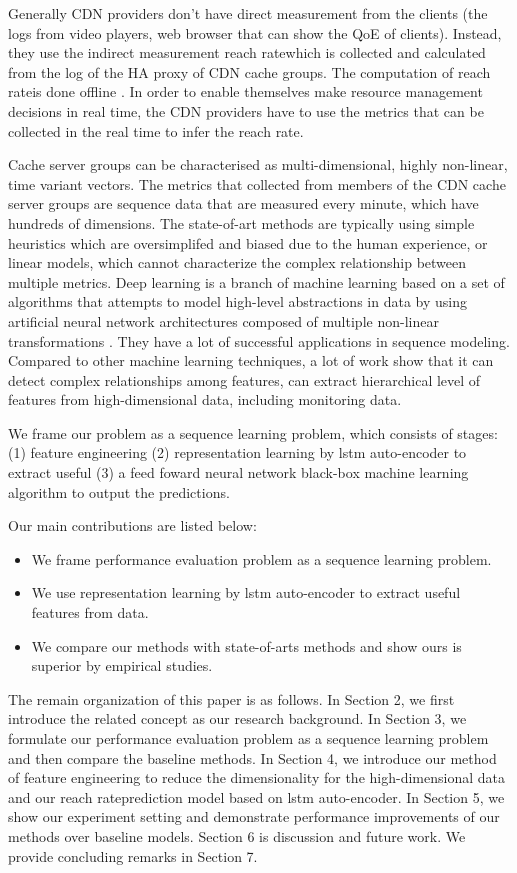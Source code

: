 \documentclass[5p]{elsarticle}
\newcommand{\dabiaolv}{reach rate}
\begin{document}
Generally CDN providers don't have direct measurement from the clients (the logs from video players, web browser that can show the QoE of clients). Instead, they use the indirect measurement \dabiaolv which is collected and calculated from the log of the HA proxy of CDN cache groups. The computation of \dabiaolv is done offline . In order to enable themselves make resource management decisions in real time, the CDN providers have to use the metrics that can be collected in the real time to infer the \dabiaolv. 

Cache server groups can be characterised as multi-dimensional, highly non-linear, time variant vectors. The metrics that collected from members of the CDN cache server groups are sequence data that are measured every minute, which have hundreds of dimensions. The state-of-art methods are typically using simple heuristics  which are oversimplifed and biased due to the human experience, or linear models, which cannot characterize the complex relationship between multiple metrics. Deep learning is a branch of machine learning based on a set of algorithms that attempts to model high-level abstractions in data by using artificial neural network architectures composed of multiple non-linear transformations \cite{Lecun2015}. They have a lot of successful applications in sequence modeling\cite{Langkvist2014AModeling}. Compared to other machine learning techniques, a lot of work show that it can detect complex relationships among features, can extract hierarchical level of features from high-dimensional data, including monitoring data.

We frame our problem as a sequence learning problem, which consists of stages: (1) feature engineering (2) representation learning by lstm auto-encoder to extract useful (3) a feed foward neural network black-box machine learning algorithm to output the predictions. 

Our main contributions are listed below:
\begin{itemize}
  \item We frame performance evaluation problem as a sequence learning problem.
  \item We use representation learning by lstm auto-encoder to extract useful features from data.
  \item We compare our methods with state-of-arts methods and show ours is superior by empirical studies.
\end{itemize}

The remain organization of this paper is as follows. In Section 2, we first introduce the related concept as our research background. In Section 3, we formulate our performance evaluation problem as a sequence learning problem and then compare the baseline methods. In Section 4, we introduce our method of feature engineering to reduce the dimensionality for the high-dimensional data and  our \dabiaolv prediction model based on lstm auto-encoder. In Section 5, we show our experiment setting and demonstrate performance improvements of our methods over baseline models. Section 6 is discussion and future work. We provide concluding remarks in Section 7.
\end{document}
